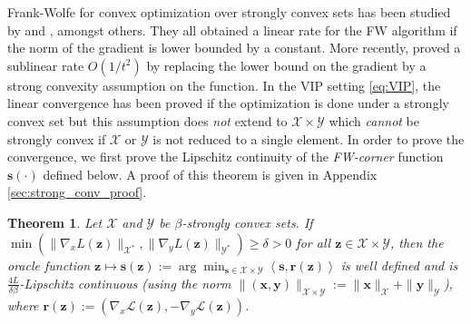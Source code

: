 \documentclass[twoside]{article}
\renewcommand{\L}{\mathcal{L}}
\newcommand{\X}{\mathcal{X}}
\newcommand{\Y}{\mathcal{Y}}
\newcommand{\M}{\X \times \Y}
\newcommand{\x}{\bm{x}}
\newcommand{\y}{\bm{y}}
\newcommand{\z}{\bm{z}}
\newcommand{\s}{\bm{s}}
\newcommand{\FF}{\r} %
\newtheorem{theorem}[definition]{Theorem}
\renewcommand{\r}{\bm{r}}
\newcommand{\innerProd}[2]{\left\langle #1 , #2 \right\rangle}
\newcommand{\0}{\mathbf{0}} %
\begin{document}
  Frank-Wolfe for convex optimization over strongly convex sets has been studied by
  \citet{levitin1966constrained,demyanov1970approximate} and \citet{dunn1979rates}, amongst others. 
  They all obtained a linear rate for the FW algorithm if the norm of the gradient is lower bounded by a constant. 
  More recently, \citet{garber2014faster} proved a sublinear rate $O(1/t^2)$ by replacing the lower bound on the gradient by a strong convexity assumption on the function.
  In the VIP setting \eqref{eq:VIP}, the linear convergence has been proved if the optimization is done under a strongly convex set but this assumption does \emph{not} extend to $\X \times \Y$ which \emph{cannot} be strongly convex if $\X$ or $\Y$ is not reduced to a single element. 
  In order to prove the convergence, we first prove the Lipschitz continuity of the \emph{FW-corner} function $\s(\cdot)$ defined below. 
  A proof of this theorem is given in Appendix \ref{sec:strong_conv_proof}.
  \begin{theorem}\label{thm:s_lip}
   Let $\X$ and $\Y$ be $\beta$-strongly convex sets. 
   If $\min(\|\nabla_{\!x} L(\z)\|_{\X^*}, \|\nabla_{\!y} L(\z)\|_{\Y^*}) \geq\delta>0$ for all $\z \in \M$, then the oracle function $\z \mapsto \s(\z) := \arg\min_{\s \in \M}\innerProd{\s}{\FF(\z)}$ is well defined and is $\frac{4L}{\delta \beta }$-Lipschitz continuous (using the norm $\|(\x,\y)\|_{\X \times \Y} := \|\x\|_\X + \|\y\|_\Y$), where $\FF(\z) := \left(
     \nabla_x \L(\z),
     -\nabla_y \L(\z)
     \right)$.
  \end{theorem}
\end{document}
